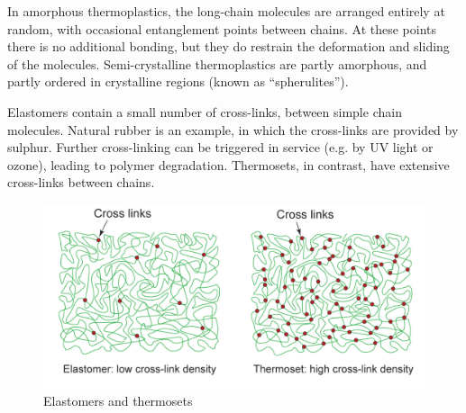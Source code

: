\documentclass{article}
\begin{document}
In amorphous thermoplastics, the long-chain molecules are arranged entirely at random, with occasional entanglement points between chains. At these points there is no additional bonding, but they do restrain the deformation and sliding of the molecules. Semi-crystalline thermoplastics are partly amorphous, and partly ordered in crystalline regions (known as “spherulites”).

\begin{definition}
    Elastomers contain a small number of cross-links, between simple chain molecules. Natural rubber is an example, in which the cross-links are provided by sulphur. Further cross-linking can be triggered in service (e.g. by UV light or ozone), leading to polymer degradation. Thermosets, in contrast, have extensive cross-links between chains.
\end{definition}

\begin{figure}[h]
    \centering
    \includegraphics{images/mat15.png}
    \caption{Elastomers and thermosets}
    \label{fig:enter-label}
\end{figure}
\end{document}
